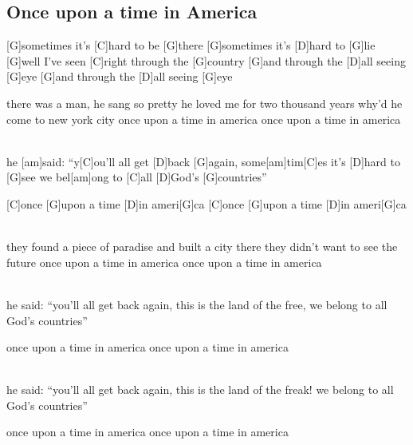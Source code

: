\subsection*{Once upon a time in America   }
\begin{guitar}

[G]sometimes it's [C]hard to be [G]there
[G]sometimes it's [D]hard to [G]lie
[G]well I've seen [C]right through the [G]country
[G]and through the [D]all seeing [G]eye
[G]and through the [D]all seeing [G]eye

there was a man, he sang so pretty
he loved me for two thousand years
why'd he come to new york city
once upon a time in america
once upon a time in america

\\
he [am]said: ``y[C]ou'll all get [D]back [G]again,
some[am]tim[C]es it's [D]hard to [G]see
we bel[am]ong to [C]all [D]God's [G]countries''

[C]once [G]upon a time [D]in ameri[G]ca
[C]once [G]upon a time [D]in ameri[G]ca

\\
they found a piece of paradise
and built a city there
they didn't want to see the future
once upon a time in america
once upon a time in america

\\
he said: ``you'll all get back again,
this is the land of the free,
we belong to all God's countries''

once upon a time in america
once upon a time in america

\\
he said: ``you'll all get back again,
this is the land of the freak!
we belong to all God's countries''

once upon a time in america
once upon a time in america
\end{guitar}
